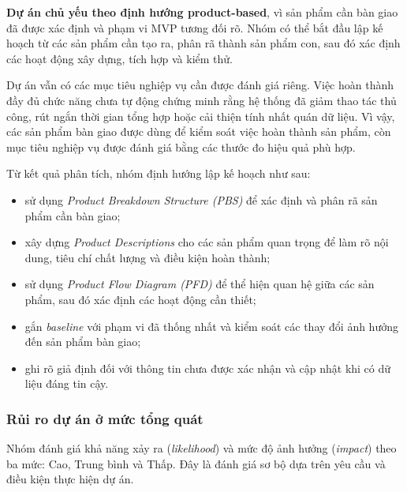 \textbf{Dự án chủ yếu theo định hướng product-based}, vì sản phẩm cần bàn giao đã được xác định và phạm vi MVP tương đối rõ. Nhóm có thể bắt đầu lập kế hoạch từ các sản phẩm cần tạo ra, phân rã thành sản phẩm con, sau đó xác định các hoạt động xây dựng, tích hợp và kiểm thử.

Dự án vẫn có các mục tiêu nghiệp vụ cần được đánh giá riêng. Việc hoàn thành đầy đủ chức năng chưa tự động chứng minh rằng hệ thống đã giảm thao tác thủ công, rút ngắn thời gian tổng hợp hoặc cải thiện tính nhất quán dữ liệu. Vì vậy, các sản phẩm bàn giao được dùng để kiểm soát việc hoàn thành sản phẩm, còn mục tiêu nghiệp vụ được đánh giá bằng các thước đo hiệu quả phù hợp.

Từ kết quả phân tích, nhóm định hướng lập kế hoạch như sau:
\begin{itemize}
    \item sử dụng \textit{Product Breakdown Structure (PBS)} để xác định và phân rã sản phẩm cần bàn giao;
    \item xây dựng \textit{Product Descriptions} cho các sản phẩm quan trọng để làm rõ nội dung, tiêu chí chất lượng và điều kiện hoàn thành;
    \item sử dụng \textit{Product Flow Diagram (PFD)} để thể hiện quan hệ giữa các sản phẩm, sau đó xác định các hoạt động cần thiết;
    \item gắn \textit{baseline} với phạm vi đã thống nhất và kiểm soát các thay đổi ảnh hưởng đến sản phẩm bàn giao;
    \item ghi rõ giả định đối với thông tin chưa được xác nhận và cập nhật khi có dữ liệu đáng tin cậy.
\end{itemize}

\subsubsection{Rủi ro dự án ở mức tổng quát}

Nhóm đánh giá khả năng xảy ra (\textit{likelihood}) và mức độ ảnh hưởng (\textit{impact}) theo ba mức: Cao, Trung bình và Thấp. Đây là đánh giá sơ bộ dựa trên yêu cầu và điều kiện thực hiện dự án.


